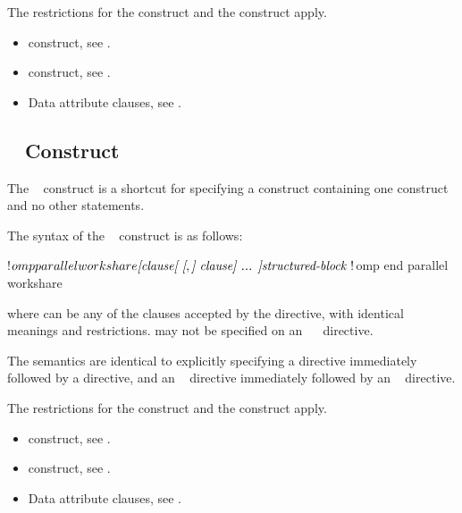 \restrictions
The restrictions for the  construct and the  
construct apply.

\crossreferences
\begin{itemize}
\item {} construct, see
.

\item {} construct, see
.

\item Data attribute clauses, see
.
\end{itemize}



\begin{fortranspecific}
\subsection{~ Construct}
\label{subsec:parallel workshare Construct}
\summary
The ~ construct is a shortcut for specifying a 
 construct containing one  construct and no 
other statements.

\syntax
The syntax of the ~ construct is as follows:

\begin{ompfPragma}
!$omp parallel workshare \plc{[clause[ [},\plc{] clause] ... ]}
   \plc{structured-block }
!$omp end parallel workshare
\end{ompfPragma}

where  can be any of the clauses accepted by the  
directive, with identical meanings and restrictions.  may not be 
specified on an ~~ directive.

\descr
The semantics are identical to explicitly specifying a  directive 
immediately followed by a  directive, and an 
~ directive immediately followed by an 
~ directive.

\restrictions
The restrictions for the  construct and the  
construct apply.

\crossreferences
\begin{itemize}
\item {} construct, see
.

\item {} construct, see
.

\item Data attribute clauses, see
.
\end{itemize}
\end{fortranspecific}



